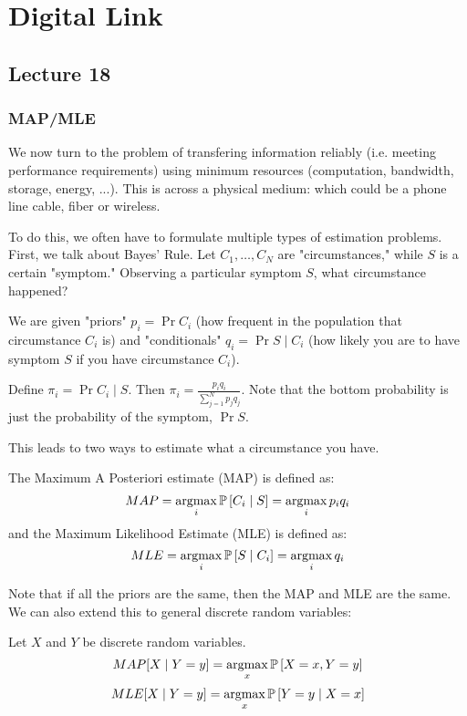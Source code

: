 \section{Digital Link}
\subsection{Lecture 18}

\subsubsection{MAP/MLE}

We now turn to the problem of transfering information reliably (i.e. meeting performance requirements) using
minimum resources (computation, bandwidth, storage, energy, ...). This is across a physical
medium: which could be a phone line cable, fiber or wireless.

To do this, we often have to formulate multiple types of estimation problems. First, we talk about Bayes' Rule.
Let $C_1, \dots, C_N$ are "circumstances," while $S$ is a certain "symptom." Observing a particular symptom $S$,
what circumstance happened?

We are given "priors" $p_i = \Pr{C_i}$ (how frequent in the population that circumstance $C_i$ is)
and "conditionals" $q_i = \Pr{S \mid C_i}$ (how likely you are to have symptom $S$ if you have circumstance $C_i$).

\begin{theorem}
    Define $\pi_i = \Pr{C_i \mid S}$. Then $\pi_i = \frac{p_i q_i}{\sum_{j = 1}^N p_j q_j}$.
    Note that the bottom probability is just the probability of the symptom, $\Pr{S}$.
\end{theorem}

This leads to two ways to estimate what a circumstance you have.

\begin{definition}
    The Maximum A Posteriori estimate (MAP) is defined as:
    \[ MAP = \operatorname*{argmax}_i \mathbb{P}\left[ C_i \mid S \right] = \operatorname*{argmax}_i p_i q_i \]
    and the Maximum Likelihood Estimate (MLE) is defined as:
    \[ MLE = \operatorname*{argmax}_i \mathbb{P}\left[ S \mid C_i \right] = \operatorname*{argmax}_i q_i \]
\end{definition}

Note that if all the priors are the same, then the MAP and MLE are the same.
We can also extend this to general discrete random variables:
\begin{definition}
    Let $X$ and $Y$ be discrete random variables.
    \[ MAP[X \mid Y = y] = \operatorname*{argmax}_x \mathbb{P}\left[ X=x, Y=y \right] \]
    \[ MLE[X \mid Y = y] = \operatorname*{argmax}_x \mathbb{P}\left[ Y = y \mid X = x \right] \]
\end{definition}

